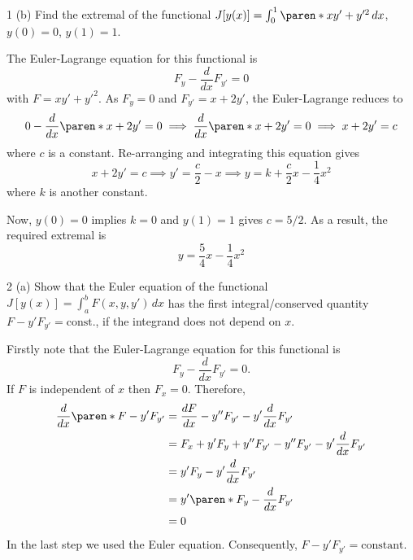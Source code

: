 \documentclass[11pt]{penrose}
\begin{document}
\begin{problem}{1 (b)}
    Find the extremal of the functional $J[y(x)] = \int_0^1 \paren*{xy' + y'^2} \,dx$, $y(0) = 0$, $y(1) = 1$.

    \solution The Euler-Lagrange equation for this functional is
    \begin{equation*}
        F_{y} - \frac{d}{dx}F_{y'}= 0
    \end{equation*}
    with $F = xy' + y'^2$. As $F_{y} = 0$ and $F_{y'} = x + 2y'$, the Euler-Lagrange reduces to
    \begin{equation*}
        0 - \frac{d}{dx}\paren*{x + 2y'}= 0
        \implies
        \frac{d}{dx}\paren*{x + 2y'}= 0
        \implies
        x + 2y' = c
    \end{equation*}
    where $c$ is a constant. Re-arranging and integrating this equation gives
    \begin{equation*}
        x + 2y' = c
        \implies
        y' = \frac{c}{2} - x
        \implies
        y = k + \frac{c}{2}x - \frac{1}{4}x^2
    \end{equation*}
    where $k$ is another constant.

    Now, $y(0) = 0$ implies $k = 0$ and $y(1) = 1$ gives $c = 5/2$. As a result, the required extremal is
    \begin{equation*}
        y = \frac{5}{4}x - \frac{1}{4}x^2
    \end{equation*}
\end{problem}

\begin{problem}{2 (a)}
    Show that the Euler equation of the functional $J[y(x)] = \int_a^b F(x,y,y') \,dx$ has the first integral/conserved quantity $F - y' F_{y'} = \text{const.}$, if the integrand does not depend on $x$.

    \solution Firstly note that the Euler-Lagrange equation for this functional is
    \begin{equation*}
        F_{y} - \frac{d}{dx}F_{y'} = 0.
    \end{equation*}
    If $F$ is independent of $x$ then $F_x = 0$. Therefore,
    \begin{align*}
        \frac{d}{dx} \paren*{F - y' F_{y'}}
        &= \frac{dF}{dx} - y'' F_{y'} - y' \frac{d}{dx}F_{y'}\\
        &= F_x + y' F_{y} + y'' F_{y'} - y'' F_{y'} - y' \frac{d}{dx}F_{y'}\\
        &= y' F_{y} - y' \frac{d}{dx}F_{y'}\\
        &= y' \paren*{F_{y} - \frac{d}{dx}F_{y'}}\\
        &= 0
    \end{align*}
    In the last step we used the Euler equation. Consequently, $F - y' F_{y'} = \text{constant}$.
\end{problem}
\end{document}
